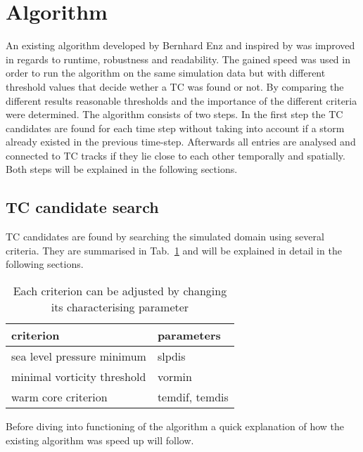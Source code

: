 \section{Algorithm}
An existing algorithm developed by Bernhard Enz and inspired by \cite{orig-tracking} was improved in regards to runtime, robustness and
readability. The gained speed was used in order to run the algorithm on the
same simulation data but with different threshold values that decide wether a
TC was found or not. By comparing the different results reasonable thresholds
and the importance of the different criteria were determined.\newline
The algorithm consists of two steps. In the first step the TC candidates are
found for each time step without taking into account if a storm already existed
in the previous time-step. Afterwards all entries are analysed and connected to
TC tracks if they lie close to each other temporally and spatially. Both steps
will be explained in the following sections.
\subsection{TC candidate search}
TC candidates are found by searching the simulated domain using several
criteria. They are summarised in Tab.~\ref{tab:search-algo-summ} and will be
explained in detail in the following sections. 
\begin{table}[h]
	\centering
	\begin{tabular}{|l|l|}
		\hline
		\textbf{criterion}          & \textbf{parameters} \\ \hline
		sea level pressure minimum  & slpdis              \\
		minimal vorticity threshold & vormin              \\
		warm core criterion         & temdif, temdis      \\ \hline
	\end{tabular}
	\caption{Each criterion can be adjusted by changing its characterising
		parameter}
	\label{tab:search-algo-summ}
\end{table}
Before diving into functioning of the algorithm a quick explanation of how the existing algorithm was speed up will follow.

